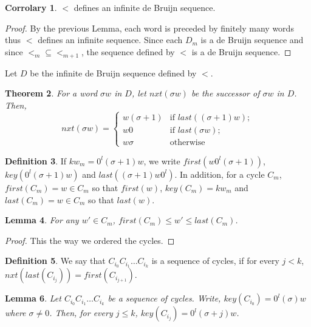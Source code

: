\documentclass{article}
\newtheorem{theorem}{Theorem}
\newtheorem{lemma}[theorem]{Lemma}
\theoremstyle{definition}
\newtheorem{definition}[theorem]{Definition}
\newtheorem{corrolary}[theorem]{Corrolary}
\begin{document}
\begin{corrolary}
	$<$ defines an infinite de Bruijn sequence.
\end{corrolary}

\begin{proof}
	By the previous Lemma, each word is preceded by finitely many words thus $<$ defines an infinite sequence. Since each $D_m$ is a de Bruijn sequence and since $<_m\subseteq<_{m+1}$, the sequence defined by $<$ is a de Bruijn sequence. 
\end{proof}

Let $D$ be the infinite de Bruijn sequence defined by $<$. 

\begin{theorem}
	For a  word $\sigma w$ in $D$, let $nxt(\sigma w)$ be the successor of $\sigma w$ in $D$. Then,
	$$nxt(\sigma w)=\left\{ \begin{array}{ll}
	w(\sigma+1) & \text{if }last((\sigma+1)w);\\
	w0          & \text{if } last(\sigma w);\\
	w\sigma     & \text{otherwise}
	\end{array}\right.$$
\end{theorem}

\begin{definition}
	If $kw_m=0^l(\sigma+1)w$, we write $first(w0^l(\sigma+1))$, $key(0^l(\sigma+1)w)$ and $last((\sigma+1)w0^l)$. In addition, for a cycle $C_m$, $first(C_m)=w\in C_m$ so that $first(w)$,  $key(C_m)=kw_m$ and $last(C_m)=w\in C_m$ so that $last(w)$. 
\end{definition}

\begin{lemma}
	For any $w'\in C_m$, $first(C_m)\leq w'\leq last(C_m)$.
\end{lemma}
\begin{proof}
	This the way we ordered the cycles.
\end{proof}



\begin{definition}
	We say that $C_{i_0}C_{i_1}\dots C_{i_k}$ is a sequence of cycles, if for every $j<k$, $nxt(last(C_{i_j}))=first(C_{i_{j+1}})$.
\end{definition}

\begin{lemma}
	\label{sequence}
	Let $C_{i_0}C_{i_1}\dots C_{i_k}$ be a sequence of cycles. Write, $key(C_{i_0})=0^l(\sigma)w$ where $\sigma\neq 0$. Then, for every $j\leq k$, $key(C_{i_j})=0^l(\sigma+j)w$.
\end{lemma}
\end{document}
